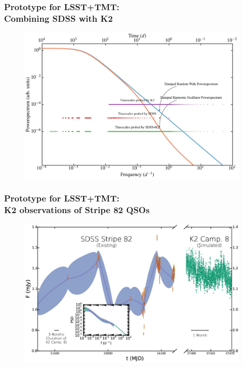 \documentclass[hyperref={pdfpagelabels=false}]{beamer}
\begin{document}
\begin{frame}
\frametitle{Prototype for LSST+TMT:\\Combining SDSS with K2}
        \begin{figure}
          \includegraphics[scale=0.065]{images/PowerOfSDSSK2.jpg}
        \end{figure}
\end{frame}

\begin{frame}
\frametitle{Prototype for LSST+TMT:\\K2 observations of Stripe 82 QSOs}
        \begin{figure}
          \includegraphics[scale=0.3]{images/LC_2.jpg}
        \end{figure}
\end{frame}
\end{document}
